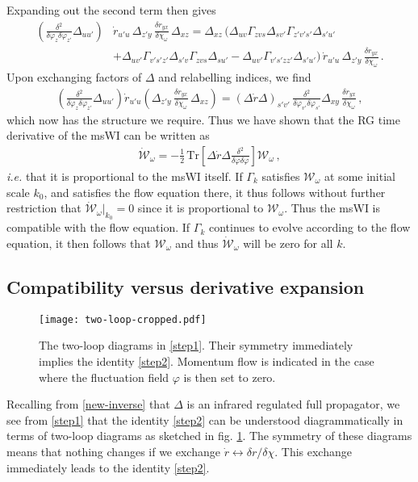 \documentclass[11pt]{book} %
\numberwithin{equation}{chapter}
\begin{document}
Expanding out the second term then gives
\begin{align}
\label{step1}
	\left(\frac{\delta^2}{\delta\varphi_z\delta\varphi_{z'}}\Delta_{uu'}\right)
	&\dot r_{u'u} \, \Delta_{z'y} \, \frac{\delta r_{yx}}{\delta\chi_\omega} \, \Delta_{xz}
  = \Delta_{xz} \, \bigg(\Delta_{uv}\Gamma_{zvs}\Delta_{sv'}\Gamma_{z'v's'}\Delta_{s'u'} \nonumber\\
  &+\Delta_{uv'}\Gamma_{v's'z'}\Delta_{s'v}\Gamma_{zvs}\Delta_{su'}
	-\Delta_{uv'}\Gamma_{v's'zz'}\Delta_{s'u'}\bigg) \,
	\dot r_{u'u} \, \Delta_{z'y} \, \frac{\delta r_{yx}}{\delta\chi_\omega} \,.
\end{align}
Upon exchanging factors of $\Delta$ and relabelling indices, we find
\begin{align}
\label{step2}
	\left(\frac{\delta^2}{\delta\varphi_{z}\delta\varphi_{z'}}\Delta_{uu'}\right)
	\dot r_{u'u}\left(\Delta_{z'y} \, \frac{\delta r_{yx}}{\delta\chi_{\omega}} \, \Delta_{xz}\right)=
	(\Delta\dot r\Delta)_{s'v'} \, \frac{\delta^2}{\delta\varphi_{v'}\delta\varphi_{s'}}
	\Delta_{xy} \, \frac{\delta r_{yx}}{\delta\chi_{\omega}} \,,
\end{align}
which now has the structure we require.
Thus we have shown that the RG time derivative of the msWI can be written as
\begin{align}
	\mathcal{\dot W}_{\omega}=-\frac{1}{2} \, \mathrm{Tr}
	\left[\Delta \dot r\Delta\frac{\delta^2}{\delta\varphi\delta\varphi}\right]\mathcal{W}_{\omega} \,,
\end{align}
\emph{i.e.} that it is proportional to the msWI itself.
If $\Gamma_{k}$ satisfies $\mathcal{W_\omega}$ at some initial scale $k_0$,
and satisfies the flow equation there, it thus follows without further restriction that
$\mathcal{\dot W_\omega}|_{k_{0}}=0$ since it is proportional to $\mathcal{W_\omega}$.
Thus the msWI is compatible with the flow equation.
If $\Gamma_{k}$ continues to evolve according to the flow equation,
it then follows that $\mathcal{W_\omega}$ and thus $\mathcal{\dot W_\omega}$ will be zero for all $k$.


\subsection{Compatibility versus derivative expansion}
\label{sec:exact-vs-derivatives}

\begin{figure}
  \centering
  \texttt{[image: two-loop-cropped.pdf]}
  \caption{The two-loop diagrams in \eqref{step1}.
    Their symmetry immediately implies the identity \eqref{step2}.
  Momentum flow is indicated in the case where the fluctuation field $\varphi$ is then set to zero.}
  \label{fig:two-loop}
\end{figure}
Recalling from \eqref{new-inverse} that $\Delta$ is an infrared regulated full propagator,
we see from \eqref{step1} that the identity \eqref{step2} can be understood diagrammatically
in terms of two-loop diagrams as sketched in fig. \ref{fig:two-loop}.
The symmetry of these diagrams means that nothing changes if we
exchange $\dot{r}\leftrightarrow\delta r/\delta\chi$.
This exchange immediately leads to the identity \eqref{step2}.
\end{document}
